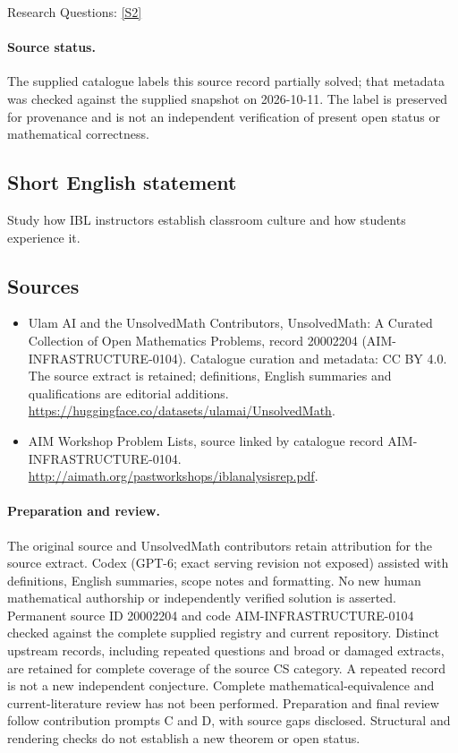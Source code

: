 \documentclass[11pt]{article}
\begin{document}
Research Questions: \href{http://aimath.org/pastworkshops/iblanalysisrep.pdf}{[S2]}
\paragraph{Source status.}
The supplied catalogue labels this source record partially solved; that metadata was checked against the supplied snapshot on 2026-10-11. The label is preserved for provenance and is not an independent verification of present open status or mathematical correctness.
\subsection{Short English statement}
Study how IBL instructors establish classroom culture and how students experience it.
\subsection{Sources}
\begin{itemize}
\item[S1] Ulam AI and the UnsolvedMath Contributors, UnsolvedMath: A Curated Collection of Open Mathematics Problems, record 20002204 (AIM-INFRASTRUCTURE-0104). Catalogue curation and metadata: CC BY 4.0. The source extract is retained; definitions, English summaries and qualifications are editorial additions.
\url{https://huggingface.co/datasets/ulamai/UnsolvedMath}.
\item[S2] AIM Workshop Problem Lists, source linked by catalogue record AIM-INFRASTRUCTURE-0104.
\url{http://aimath.org/pastworkshops/iblanalysisrep.pdf}.
\end{itemize}
\paragraph{Preparation and review.}
The original source and UnsolvedMath contributors retain attribution for the source extract. Codex (GPT-6; exact serving revision not exposed) assisted with definitions, English summaries, scope notes and formatting. No new human mathematical authorship or independently verified solution is asserted. Permanent source ID 20002204 and code AIM-INFRASTRUCTURE-0104 checked against the complete supplied registry and current repository. Distinct upstream records, including repeated questions and broad or damaged extracts, are retained for complete coverage of the source CS category. A repeated record is not a new independent conjecture. Complete mathematical-equivalence and current-literature review has not been performed. Preparation and final review follow contribution prompts C and D, with source gaps disclosed. Structural and rendering checks do not establish a new theorem or open status.
\label{end:20002204}
\end{document}
